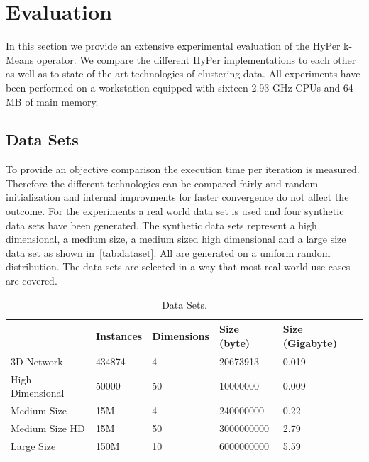 \chapter{Evaluation}\label{chapter:evaluation}

In this section we provide an extensive experimental evaluation of the HyPer k-Means operator. We compare the different  HyPer implementations to each other as well as to state-of-the-art technologies of clustering data. 
All experiments have been performed on a workstation equipped with sixteen 2.93 GHz CPUs and 64 MB of main memory.


\section{Data Sets}
To provide an objective comparison the execution time per iteration is measured. Therefore the different technologies can be compared fairly and random initialization and internal improvments for faster convergence do not affect the outcome. For the experiments a real world data set is used and four synthetic data sets have been generated. The synthetic data sets represent a high dimensional, a medium size, a medium sized high dimensional and a large size data set as shown in~\autoref{tab:dataset}. All are generated on a uniform random distribution. The data sets are selected in a way that most real world use cases are covered.

\begin{table}[htsb]
  \caption[Data Sets]{Data Sets.}\label{tab:dataset}
  \centering
  \begin{tabular}{l l l l l}
    \toprule
      & Instances & Dimensions & Size (byte) & Size (Gigabyte) \\
    \midrule
      3D Network        & 434874    & 4     & 20673913 & 0.019 \\
      High Dimensional  & 50000     & 50    & 10000000 & 0.009 \\
      Medium Size       & 15M       & 4     & 240000000 & 0.22 \\
      Medium Size HD    & 15M       & 50    & 3000000000 & 2.79 \\
      Large Size        & 150M      & 10    & 6000000000 & 5.59 \\
    \bottomrule
  \end{tabular}
\end{table}



